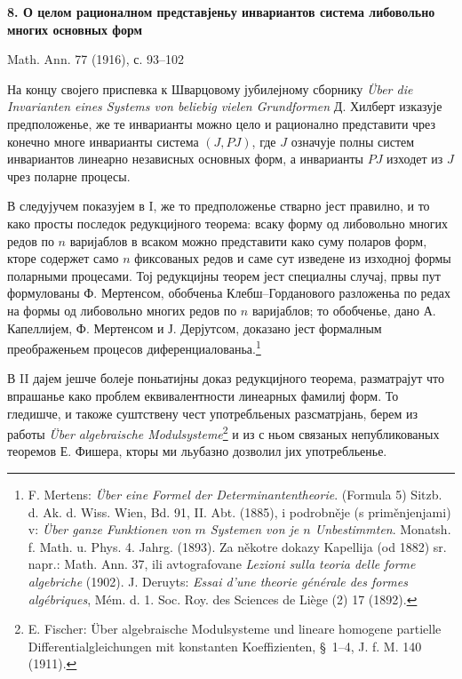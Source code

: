 \documentclass[11pt]{article}
\begin{document}
\begin{center}
{\Large\bfseries 8. О целом рационалном представјеньу инвариантов система либовольно многих основных форм}\par
\vspace{1.2em}
Math. Ann. 77 (1916), с. 93--102
\end{center}

\vspace{1em}

На концу својего приспевка к Шварцовому јубилејному сборнику \emph{Über die Invarianten eines Systems von beliebig vielen Grundformen} Д. Хилберт изказује предположенье, же те инварианты можно цело и рационално представити чрез конечно многе инварианты система $(J,PJ)$, где $J$ означује полны систем инвариантов линеарно независных основных форм, а инварианты $PJ$ изходет из $J$ чрез поларне процесы.

В следујучем показујем в I, же то предположенье стварно јест правилно, и то како просты последок редукцијного теорема: всаку форму од либовольно многих редов по $n$ варијаблов в всаком можно представити како суму поларов форм, кторе содержет само $n$ фиксованых редов и саме сут изведене из изходној формы поларными процесами. Тој редукцијны теорем јест специалны случај, првы пут формулованы Ф. Мертенсом, обобченьа Клебш--Горданового разложеньа по редах на формы од либовольно многих редов по $n$ варијаблов; то обобченье, дано А. Капеллијем, Ф. Мертенсом и Ј. Дерјутсом, доказано јест формалным преображеньем процесов диференциалованьа.\footnote{F. Mertens: \emph{Über eine Formel der Determinantentheorie}. (Formula 5) Sitzb. d. Ak. d. Wiss. Wien, Bd. 91, II. Abt. (1885), i podrobněje (s priměnjenjami) v: \emph{Über ganze Funktionen von $m$ Systemen von je $n$ Unbestimmten}. Monatsh. f. Math. u. Phys. 4. Jahrg. (1893). Za někotre dokazy Kapellija (od 1882) sr. napr.: Math. Ann. 37, ili avtografovane \emph{Lezioni sulla teoria delle forme algebriche} (1902). J. Deruyts: \emph{Essai d'une theorie générale des formes algébriques}, Mém. d. 1. Soc. Roy. des Sciences de Liège (2) 17 (1892).}

В II дајем јешче болеје поньатијны доказ редукцијного теорема, разматрајут что впрашанье како проблем еквивалентности линеарных фамилиј форм. То гледишче, и такоже суштствену чест употребльеных разсматрјань, берем из работы \emph{Über algebraische Modulsysteme}\footnote{E. Fischer: Über algebraische Modulsysteme und lineare homogene partielle Differentialgleichungen mit konstanten Koeffizienten, \S\ 1--4, J. f. M. 140 (1911).} и из с ньом связаных непубликованых теоремов Е. Фишера, кторы ми льубазно дозволил јих употребльенье.
\end{document}
